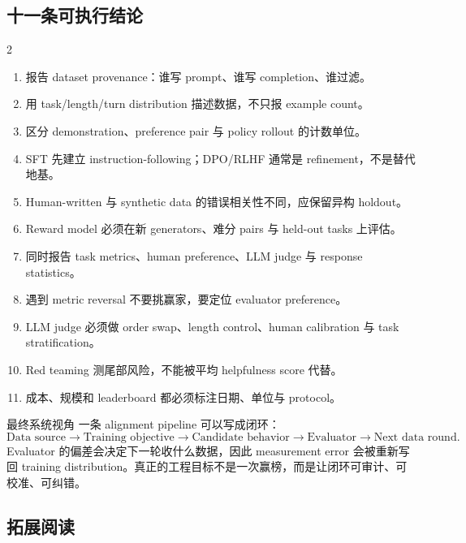 \documentclass[a4paper]{article}
\begin{document}
\subsection{十一条可执行结论}

\begingroup
\footnotesize
\setlength{\columnsep}{1.2em}
\begin{multicols}{2}
\begin{enumerate}[itemsep=0.05em,topsep=0.1em,parsep=0pt,leftmargin=*]
  \item 报告 dataset provenance：谁写 prompt、谁写 completion、谁过滤。
  \item 用 task/length/turn distribution 描述数据，不只报 example count。
  \item 区分 demonstration、preference pair 与 policy rollout 的计数单位。
  \item SFT 先建立 instruction-following；DPO/RLHF 通常是 refinement，不是替代地基。
  \item Human-written 与 synthetic data 的错误相关性不同，应保留异构 holdout。
  \item Reward model 必须在新 generators、难分 pairs 与 held-out tasks 上评估。
  \item 同时报告 task metrics、human preference、LLM judge 与 response statistics。
  \item 遇到 metric reversal 不要挑赢家，要定位 evaluator preference。
  \item LLM judge 必须做 order swap、length control、human calibration 与 task stratification。
  \item Red teaming 测尾部风险，不能被平均 helpfulness score 代替。
  \item 成本、规模和 leaderboard 都必须标注日期、单位与 protocol。
\end{enumerate}
\end{multicols}
\endgroup

\begin{importantbox}{最终系统视角}
一条 alignment pipeline 可以写成闭环：
\[
\text{Data source}\rightarrow\text{Training objective}\rightarrow\text{Candidate behavior}
\rightarrow\text{Evaluator}\rightarrow\text{Next data round}.
\]
Evaluator 的偏差会决定下一轮收什么数据，因此 measurement error 会被重新写回 training distribution。真正的工程目标不是一次赢榜，而是让闭环可审计、可校准、可纠错。
\end{importantbox}

\subsection{拓展阅读}
\end{document}
